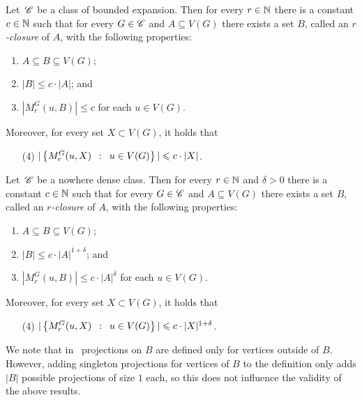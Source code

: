 \begin{lemma}\label{lem:closure-be}
  Let\, $\mathscr{C}$ be a class of bounded expansion.  Then for every
  $r\in \mathbb{N}$ there is a constant $c\in \mathbb{N}$ such that for every
  $G\in \mathscr{C}$ and $A\subseteq V(G)$ there exists a set $B$, called an
  {\em{$r$-closure}} of $A$, with the following properties:
\begin{enumerate}
\item $A\subseteq B\subseteq V(G)$;
\item $|B|\leq c\cdot |A|$; and
\item $|M_r^G(u,B)|\leq c$ for each $u\in V(G)$.
  \end{enumerate}
  Moreover, for every set $X\subset V(G)$, it holds that
  \begin{enumerate}
  \item[(4)] $|\left\{M_r^G(u,X) \,~:~\, u\in V(G) \right\}|\leqslant c\cdot |X|$.
  \end{enumerate}
\end{lemma}

\begin{lemma}\label{lem:closure-nd}
  Let\, $\mathscr{C}$ be a nowhere dense class.  Then for every $r\in\mathbb{N}$ and
  $\delta>0$ there is a constant $c\in\mathbb{N}$ such that for every
  $G\in \mathscr{C}$ and $A\subseteq V(G)$ there exists a set $B$, called an
  {\em{$r$-closure}} of $A$, with the following properties:
\begin{enumerate}
  \item $A\subseteq B\subseteq V(G)$;
  \item $|B|\leq c\cdot |A|^{1+\delta}$; and
  \item $|M_r^G(u,B)|\leq c\cdot |A|^{\delta}$ for each $u\in V(G)$.
  \end{enumerate}
  Moreover, for every set $X\subset V(G)$, it holds that
  \begin{enumerate}
  \item[(4)] $|\left\{M_r^G(u,X) \,~:~\, u\in V(G) \right\}|\leqslant c\cdot |X|^{1+\delta}$.
\end{enumerate}
\end{lemma}

We note that
in~\cite{drange2016kernelization,eickmeyer2016neighborhood}
projections on $B$ are defined only for vertices outside of $B$.
However, adding singleton projections for vertices of $B$ to the
definition only adds $|B|$ possible projections of size $1$ each, so
this does not influence the validity of the above results.


